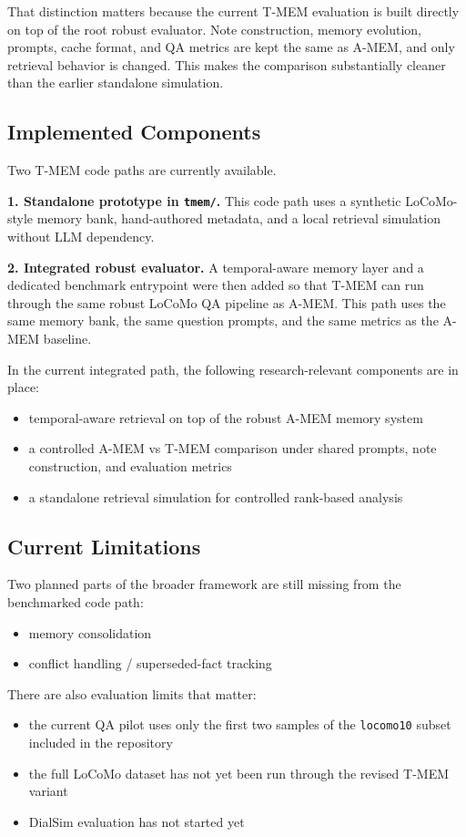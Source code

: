 \documentclass[conference]{IEEEtran}
\begin{document}
That distinction matters because the current T-MEM evaluation is built directly on top of the root robust evaluator. Note construction, memory evolution, prompts, cache format, and QA metrics are kept the same as A-MEM, and only retrieval behavior is changed. This makes the comparison substantially cleaner than the earlier standalone simulation.

\subsection{Implemented Components}

Two T-MEM code paths are currently available.

\textbf{1. Standalone prototype in \texttt{tmem/}.} This code path uses a synthetic LoCoMo-style memory bank, hand-authored metadata, and a local retrieval simulation without LLM dependency.

\textbf{2. Integrated robust evaluator.} A temporal-aware memory layer and a dedicated benchmark entrypoint were then added so that T-MEM can run through the same robust LoCoMo QA pipeline as A-MEM. This path uses the same memory bank, the same question prompts, and the same metrics as the A-MEM baseline.

In the current integrated path, the following research-relevant components are in place:
\begin{itemize}
    \item temporal-aware retrieval on top of the robust A-MEM memory system
    \item a controlled A-MEM vs T-MEM comparison under shared prompts, note construction, and evaluation metrics
    \item a standalone retrieval simulation for controlled rank-based analysis
\end{itemize}

\subsection{Current Limitations}

Two planned parts of the broader framework are still missing from the benchmarked code path:
\begin{itemize}
    \item memory consolidation
    \item conflict handling / superseded-fact tracking
\end{itemize}

There are also evaluation limits that matter:
\begin{itemize}
    \item the current QA pilot uses only the first two samples of the \texttt{locomo10} subset included in the repository
    \item the full LoCoMo dataset has not yet been run through the revised T-MEM variant
    \item DialSim evaluation has not started yet
\end{itemize}
\end{document}
